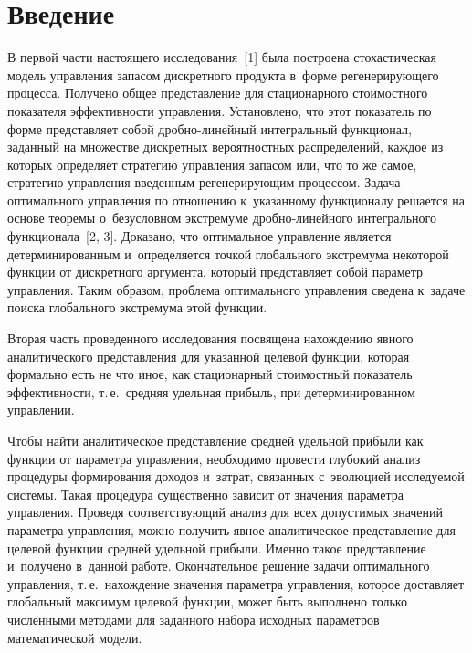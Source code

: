 \vspace*{-9pt}



\thispagestyle{headings}

\begin{multicols}{2}

\label{st\stat}


\section{Введение}

  В первой части настоящего исследования~[1] была по\-стро\-ена стохастическая 
модель управ\-ле\-ния запасом дискретного продукта в~форме регенерирующего 
процесса. Получено общее пред\-став\-ле\-ние для стационарного стоимостного 
показателя эффективности управ\-ле\-ния. Установлено, что этот показатель по 
форме пред\-став\-ля\-ет собой дроб\-но-ли\-ней\-ный интегральный функционал, 
заданный на множестве дис\-крет\-ных вероятностных распределений, каждое из 
которых определяет стратегию управ\-ле\-ния запасом или, что то же самое, 
стратегию управ\-ле\-ния введенным регенерирующим процессом. Задача 
оптимального управ\-ле\-ния по отношению к~указанному функционалу решается 
на основе тео\-ре\-мы о~безуслов\-ном экстремуме дроб\-но-ли\-ней\-но\-го 
интегрального функционала~[2, 3]. Доказано, что оптимальное управ\-ле\-ние 
является детерминированным и~определяется точ\-кой глобального экстремума 
некоторой функ\-ции от дискретного аргумента, который пред\-став\-ля\-ет собой 
параметр управ\-ле\-ния. Таким образом, проб\-ле\-ма оптимального управ\-ле\-ния 
сведена к~задаче поиска глобального экстремума этой функции.
  
  Вторая часть проведенного исследования
посвящена нахождению явного аналитического пред\-став\-ле\-ния для указанной 
целевой функции, которая формально есть не что иное, как стационарный 
стоимостный показатель эф\-фек\-тив\-ности, т.\,е.\ сред\-няя удельная прибыль, 
при детерминированном управ\-ле\-нии.
  
Чтобы найти аналитическое пред\-став\-ле\-ние средней удельной 
прибыли как функции от па\-ра\-мет\-ра управ\-ле\-ния, необходимо провести 
глубокий анализ процедуры формирования доходов и~за\-трат, связанных 
с~эволюцией ис\-сле\-ду\-емой сис\-темы.
  Такая процедура существенно зависит от значения па\-ра\-мет\-ра управ\-ле\-ния. 
Проведя со\-от\-вет\-ст\-ву\-ющий анализ для всех допустимых значений па\-ра\-мет\-ра 
управ\-ле\-ния, мож\-но получить явное аналитическое пред\-став\-ле\-ние для целевой 
функции сред\-ней удельной прибыли. Именно такое пред\-став\-ле\-ние и~получено 
в~данной работе. Окончательное решение задачи оптимального управ\-ле\-ния, т.\,е.\ 
на\-хож\-де\-ние значения па\-ра\-мет\-ра управ\-ле\-ния, которое до\-став\-ля\-ет 
глобальный максимум целевой функции, может быть выполнено только 
чис\-лен\-ны\-ми методами для заданного набора исходных па\-ра\-мет\-ров 
математической модели.


\end{multicols}
